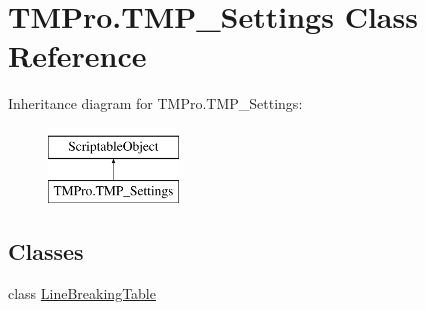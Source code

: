 \hypertarget{class_t_m_pro_1_1_t_m_p___settings}{}\section{T\+M\+Pro.\+T\+M\+P\+\_\+\+Settings Class Reference}
\label{class_t_m_pro_1_1_t_m_p___settings}
Inheritance diagram for T\+M\+Pro.\+T\+M\+P\+\_\+\+Settings\+:\begin{figure}[H]
\begin{center}
\leavevmode
\includegraphics[height=2.000000cm]{class_t_m_pro_1_1_t_m_p___settings}
\end{center}
\end{figure}
\subsection*{Classes}
\begin{DoxyCompactItemize}
\item 
class \mbox{\hyperlink{class_t_m_pro_1_1_t_m_p___settings_1_1_line_breaking_table}{Line\+Breaking\+Table}}
\end{DoxyCompactItemize}
